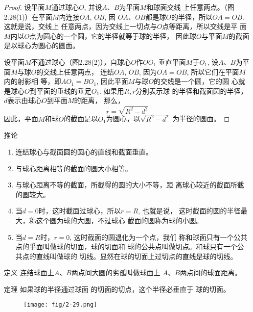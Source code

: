 \begin{proof}
    设平面$M$通过球心$O$, 并设$A$、$B$为平面$M$和球面交线
    上任意两点。（图2.28(1)）在平面$M$内连接$OA$, $OB$, 因
    $OA$、$OB$都是球$O$的半径，所以$OA=OB$. 这就是说，交线上
    任意两点，因为交线上一切点与$O$点等距离，所以交线是平
    面$M$内以$O$点为圆心的一个圆，它的半径就等于球的半径，
    因此球$O$与平面$M$的截面是以球心为圆心的圆面。

设平面$M$不通过球心（图2.28(2)），自球心$O$作$OO_1$
    垂直平面$M$于$O_1$, 设$A$、$B$为平面$M$与球$O$的交线上任意两点，
    连结$OA$, $OB$, 因为$OA=OB$, 所以它们在平面$M$内的射影相
    等，即$AO_1=BO_1$, 因此平面$M$与球$O$的交线是一个圆，它的圆
    心就是球心$O$到平面的垂线的垂足$O_1$. 如果用$R,r$分别表示球
    的半径和截面圆的半径，$d$表示由球心$O$到平面$M$的距离，
那么，
\[r=\sqrt{R^2-d^2}\]
因此，平面$M$和球$O$的截面是以$O_1$为圆心，以$\sqrt{R^2-d^2}$
为半径的圆面。
\end{proof}

\begin{blk}{推论}
\begin{enumerate}
\item 连结球心与截面圆的圆心的直线和截面垂直。
\item 与球心距离相等的截面的圆大小相等。
\item 与球心距离不等的截面，所截得的圆的大小不等，距
离球心较近的截面所截的圆较大。
\item 当$d=0$时，这时截面过球心，所以$r=R$, 也就是说，
这时截面的圆的半径最大，称这个圆为球的大圆，不过球心
截面的圆称为球的小圆。
\item 当$d=R$时，$r=0$, 这时截面的圆退化为一个点，我们
称和球面只有一个公共点的乎面叫做球的切面，球的切面和
球的公共点叫做切点。和球只有一个公共点的直线叫做球的
切线。显然在球的切面上过切点的直线是球的切线。
\end{enumerate}
    
\end{blk}

\begin{blk}{定义} 
    连结球面上$A$、$B$两点间大圆的劣孤叫做球面上
$A$、$B$两点间的球面距离。
\end{blk}

\begin{blk}
    {定理} 如果球的半径通过球面
    的切面的切点，这个半径必垂直于
    球的切面。
\end{blk}

\begin{figure}[htp]
    \centering
\texttt{[image: fig/2-29.png]}
    \caption{}
\end{figure}

